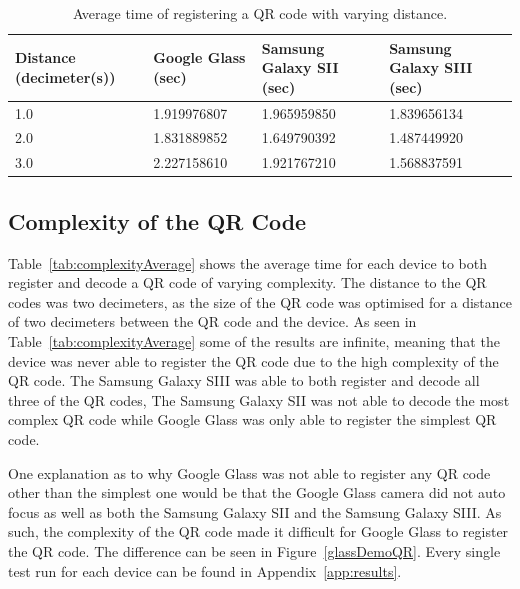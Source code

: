 	\begin{table}[H]%
    		\caption{Average time of registering a QR code with varying distance.} \label{tab:distanceAverage}
		\centering \begin{tabularx}{\textwidth}{X|X|X|X} \hline
		\textbf{Distance (decimeter(s))} & \textbf{Google Glass (sec)} & \textbf{Samsung Galaxy SII (sec)} & \textbf{Samsung Galaxy SIII (sec)} \\ \hline \hline
       
		1.0	&1.919976807	&1.965959850	&1.839656134	\\ \hline
		2.0	&1.831889852	&1.649790392	&1.487449920	\\ \hline
		3.0	&2.227158610	&1.921767210	&1.568837591	\\ \hline
		
		\end{tabularx}
	\end{table}

\subsection{Complexity of the QR Code}

Table~\ref{tab:complexityAverage} shows the average time for each device to both register and decode a QR code of varying complexity. The distance to the QR codes was two decimeters, as the size of the QR code was optimised for a distance of two decimeters between the QR code and the device. As seen in Table~\ref{tab:complexityAverage} some of the results are infinite, meaning that the device was never able to register the QR code due to the high complexity of the QR code. The Samsung Galaxy SIII was able to both register and decode all three of the QR codes, The Samsung Galaxy SII was not able to decode the most complex QR code while Google Glass was only able to register the simplest QR code.

One explanation as to why Google Glass was not able to register any QR code other than the simplest one would be that the Google Glass camera did not auto focus as well as both the Samsung Galaxy SII and the Samsung Galaxy SIII. As such, the complexity of the QR code made it difficult for Google Glass to register the QR code. The difference can be seen in Figure~\ref{glassDemoQR}. Every single test run for each device can be found in Appendix~\ref{app:results}.

